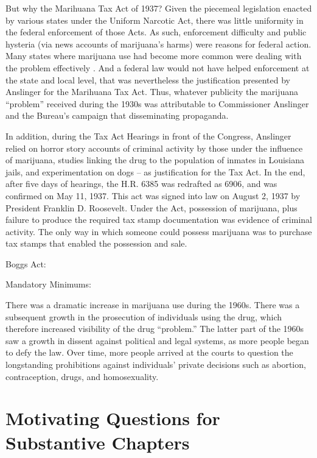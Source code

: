 But why the Marihuana Tax Act of 1937? Given the piecemeal legislation enacted by various states under the Uniform Narcotic Act, there was little uniformity in the federal enforcement of those Acts. As such, enforcement difficulty and public hysteria (via news accounts of marijuana's harms) were reasons for federal action.  Many states where marijuana use had become more common were dealing with the problem effectively \citep{bonnie_and_whitebread_1970}. And a federal law would not have helped enforcement at the state and local level, that was nevertheless the justification presented by Anslinger for the Marihuana Tax Act. Thus, whatever publicity the marijuana ``problem'' received during the 1930s was attributable to Commissioner Anslinger and the Bureau's campaign that disseminating propaganda. 

In addition, during the Tax Act Hearings \citep{tax_1937} in front of the  Congress, Anslinger relied on horror story accounts of criminal activity by those under the influence of marijuana, studies linking the drug to the population of inmates in Louisiana jails, and experimentation on dogs -- as justification for the Tax Act. In the end, after five days of hearings, the H.R. 6385 was redrafted as 6906, and was confirmed on May 11, 1937. This act was signed into law on August 2, 1937 by President Franklin D. Roosevelt. Under the Act, possession of marijuana, plus failure to produce the required tax stamp documentation was evidence of criminal activity. The only way in which someone could possess marijuana was to purchase tax stamps that enabled the possession and sale. 

Boggs Act:

Mandatory Minimums:



There was a dramatic increase in marijuana use during the 1960s. There was a subsequent growth in the prosecution of individuals using the drug, which therefore increased visibility of the drug ``problem.'' The latter part of the 1960s saw a growth in dissent against political and legal systems, as more people began to defy the law. Over time, more people arrived at the courts to question the longstanding prohibitions against individuals' private decisions such as abortion, contraception, drugs, and homosexuality. 


\section{Motivating Questions for Substantive Chapters}





